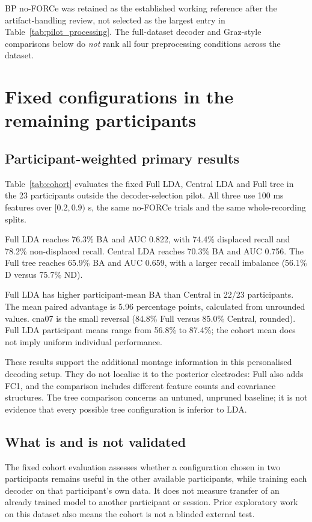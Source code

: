 \documentclass[11pt,a4paper]{article}
\begin{document}
BP no-FORCe was retained as the established working reference after the artifact-handling review, not selected as the largest entry in Table~\ref{tab:pilot_processing}. The full-dataset decoder and Graz-style comparisons below do \emph{not} rank all four preprocessing conditions across the dataset.

\clearpage
\section{Fixed configurations in the remaining participants}
\subsection{Participant-weighted primary results}
Table~\ref{tab:cohort} evaluates the fixed Full LDA, Central LDA and Full tree in the 23 participants outside the decoder-selection pilot. All three use 100 ms features over $[0.2,0.9)$ s, the same no-FORCe trials and the same whole-recording splits.
\begin{table}[H]\centering\small

\caption{Validation cohort: 23 participants, 67 eligible sessions and 27,645 evaluated trials. Acc., BA and both recalls are percentages; AUC is on $[0,1]$. Values first average eligible sessions within each participant, then participants equally.}\label{tab:cohort}
\end{table}
Full LDA reaches 76.3\% BA and AUC 0.822, with 74.4\% displaced recall and 78.2\% non-displaced recall. Central LDA reaches 70.3\% BA and AUC 0.756. The Full tree reaches 65.9\% BA and AUC 0.659, with a larger recall imbalance (56.1\% D versus 75.7\% ND).

Full LDA has higher participant-mean BA than Central in 22/23 participants. The mean paired advantage is 5.96 percentage points, calculated from unrounded values. cna07 is the small reversal (84.8\% Full versus 85.0\% Central, rounded). Full LDA participant means range from 56.8\% to 87.4\%; the cohort mean does not imply uniform individual performance.

These results support the additional montage information in this personalised decoding setup. They do not localise it to the posterior electrodes: Full also adds FC1, and the comparison includes different feature counts and covariance structures. The tree comparison concerns an untuned, unpruned baseline; it is not evidence that every possible tree configuration is inferior to LDA.

\subsection{What is and is not validated}
The fixed cohort evaluation assesses whether a configuration chosen in two participants remains useful in the other available participants, while training each decoder on that participant's own data. It does not measure transfer of an already trained model to another participant or session. Prior exploratory work on this dataset also means the cohort is not a blinded external test.
\end{document}
